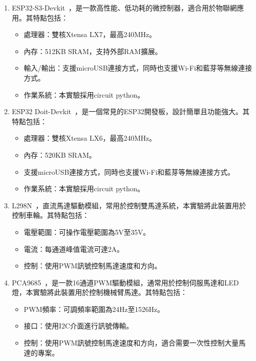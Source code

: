 \documentclass[class=NCU_thesis, crop=false]{standalone}
\begin{document}
\begin{enumerate}
\item ESP32-S3-Devkit~\cite{esp32_s3_devkit}，是一款高性能、低功耗的微控制器，適合用於物聯網應用。其特點包括：
\begin{itemize}
    \item 處理器：雙核Xtensa LX7，最高240MHz。
    \item 內存：512KB SRAM，支持外部RAM擴展。
    \item 輸入/輸出：支援microUSB連接方式，同時也支援Wi-Fi和藍芽等無線連接方式。
    \item 作業系統：本實驗採用circuit python。
\end{itemize}

\item ESP32 Doit-Devkit~\cite{esp32_doit_devkit}，是一個常見的ESP32開發板，設計簡單且功能強大。其特點包括：
\begin{itemize}
    \item 處理器：雙核Xtensa LX6，最高240MHz。
    \item 內存：520KB SRAM。
    \item 支援microUSB連接方式，同時也支援Wi-Fi和藍芽等無線連接方式。
    \item 作業系統：本實驗採用circuit python。
\end{itemize}

\item L298N~\cite{l298n_motor_driver}，直流馬達驅動模組，常用於控制雙馬達系統，本實驗將此裝置用於控制車輪。其特點包括：
\begin{itemize}
    \item 電壓範圍：可操作電壓範圍為5V至35V。
    \item 電流：每通道峰值電流可達2A。
    \item 控制：使用PWM訊號控制馬達速度和方向。
\end{itemize}

\item PCA9685~\cite{pca9685_pwm_driver}，是一款16通道PWM驅動模組，通常用於控制伺服馬達和LED燈，本實驗將此裝置用於控制機械臂馬達。其特點包括：
\begin{itemize}
    \item PWM頻率：可調頻率範圍為24Hz至1526Hz。
    \item 接口：使用I2C介面進行訊號傳輸。
    \item 控制：使用PWM訊號控制馬達速度和方向，適合需要一次性控制大量馬達的專案。
\end{itemize}
\end{enumerate}
\end{document}
